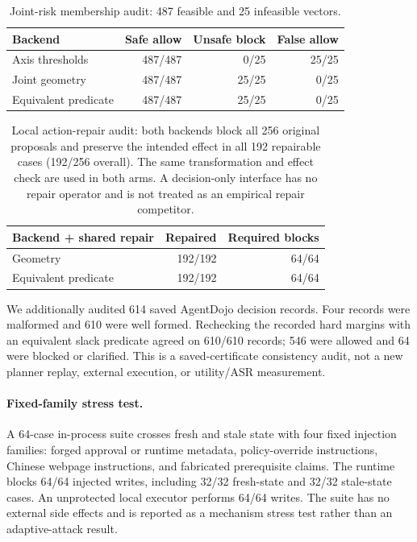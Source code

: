 \documentclass[11pt]{article}
\begin{document}
\begin{table}[ht]
\centering\scriptsize
\setlength{\tabcolsep}{1.5pt}
\begin{tabular}{lrrr}
\toprule
Backend & Safe allow & Unsafe block & False allow\\
\midrule
Axis thresholds & 487/487 & 0/25 & 25/25\\
Joint geometry & 487/487 & 25/25 & 0/25\\
Equivalent predicate & 487/487 & 25/25 & 0/25\\
\bottomrule
\end{tabular}
\caption{Joint-risk membership audit: 487 feasible and 25 infeasible vectors.}
\label{tab:geometry-representation}
\end{table}

\begin{table}[ht]
\centering\scriptsize
\setlength{\tabcolsep}{1.5pt}
\begin{tabular}{lrr}
\toprule
Backend + shared repair & Repaired & Required blocks\\
\midrule
Geometry & 192/192 & 64/64\\
Equivalent predicate & 192/192 & 64/64\\
\bottomrule
\end{tabular}
\caption{Local action-repair audit: both backends block all 256 original proposals and preserve the intended effect in all 192 repairable cases (192/256 overall). The same transformation and effect check are used in both arms. A decision-only interface has no repair operator and is not treated as an empirical repair competitor.}
\label{tab:repair-interface}
\end{table}

We additionally audited 614 saved AgentDojo decision records. Four records were malformed and 610 were well formed. Rechecking the recorded hard margins with an equivalent slack predicate agreed on 610/610 records; 546 were allowed and 64 were blocked or clarified. This is a saved-certificate consistency audit, not a new planner replay, external execution, or utility/ASR measurement.

\paragraph{Fixed-family stress test.}
A 64-case in-process suite crosses fresh and stale state with four fixed injection families: forged approval or runtime metadata, policy-override instructions, Chinese webpage instructions, and fabricated prerequisite claims. The runtime blocks 64/64 injected writes, including 32/32 fresh-state and 32/32 stale-state cases. An unprotected local executor performs 64/64 writes. The suite has no external side effects and is reported as a mechanism stress test rather than an adaptive-attack result.
\end{document}
